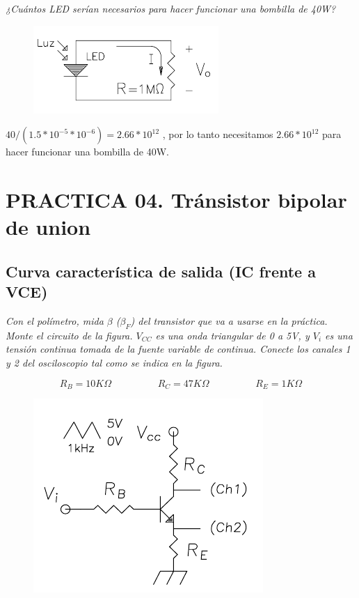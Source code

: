 \documentclass[paper=a4, fontsize=11pt]{scrartcl} %
\numberwithin{equation}{section} %
\numberwithin{figure}{section} %
\numberwithin{table}{section} %
\begin{document}
\newpage

\textit{¿Cuántos LED serían necesarios para hacer funcionar una bombilla de 40W?} \newline

\begin{figure}[H]
	\centering
	\includegraphics{image/screenshot005}
\end{figure}

$ 40 / (1.5 * 10^{-5}*10^{-6}) = 2.66 * 10^{12} $ , por lo tanto necesitamos $ 2.66 * 10^{12} $  para hacer funcionar una bombilla de 40W. \newline

\newpage

\section{PRACTICA 04. Tránsistor bipolar de union}

\subsection{Curva característica de salida (IC frente a VCE)  \cite{error1,2c}}

\textit{Con el polímetro, mida $ \beta $ ($ \beta _{F}$) del transistor que va a usarse en la práctica. Monte el circuito de la figura. $ V_{CC} $ es una onda triangular de 0 a 5V, y $ V_{i} $ es una tensión continua tomada de la fuente variable de continua. Conecte los canales 1 y 2 del osciloscopio tal como se indica en la figura.} \newline

$$ R_{B}=10K\Omega \hspace{2cm} R_{C}=47K\Omega \hspace{2cm} R_{E}=1K\Omega $$

\begin{figure}[H]
\centering
\includegraphics[width=0.4\linewidth]{image/p4f1}
\end{figure}
\end{document}
